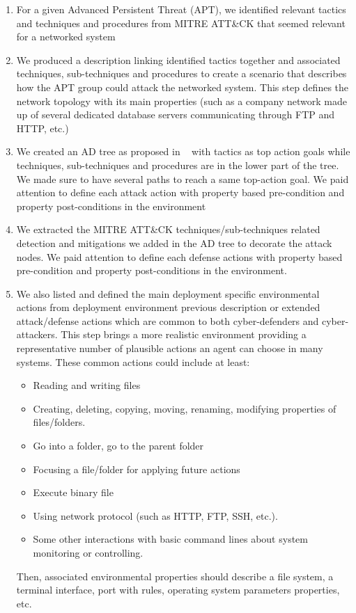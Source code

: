 \documentclass[conference]{IEEEtran}
\begin{document}
\begin{enumerate}

    \item For a given Advanced Persistent Threat (APT), we identified relevant tactics and techniques and procedures from MITRE ATT\&CK that seemed relevant for a networked system
    
    \item We produced a description linking identified tactics together and associated techniques, sub-techniques and procedures to create a scenario that describes how the APT group could attack the networked system. This step defines the network topology with its main properties (such as a company network made up of several dedicated database servers communicating through FTP and HTTP, etc.)

    \item We created an AD tree as proposed in ~\cite{BKordy2010} with tactics as top action goals while techniques, sub-techniques and procedures are in the lower part of the tree. We made sure to have several paths to reach a same top-action goal. We paid attention to define each attack action with property based pre-condition and property post-conditions in the environment

    \item We extracted the MITRE ATT\&CK techniques/sub-techniques related detection and mitigations we added in the AD tree to decorate the attack nodes. We paid attention to define each defense actions with property based pre-condition and property post-conditions in the environment.

    \item We also listed and defined the main deployment specific environmental actions from deployment environment previous description or extended attack/defense actions which are common to both cyber-defenders and cyber-attackers. This step brings a more realistic environment providing a representative number of plausible actions an agent can choose in many systems.
    These common actions could include at least:
    \begin{itemize}
        \item Reading and writing files
        \item Creating, deleting, copying, moving, renaming, modifying properties of files/folders.
        \item Go into a folder, go to the parent folder
        \item Focusing a file/folder for applying future actions
        \item Execute binary file
        \item Using network protocol (such as HTTP, FTP, SSH, etc.).
        \item Some other interactions with basic command lines about system monitoring or controlling.
    \end{itemize}
    Then, associated environmental properties should describe a file system, a terminal interface, port with rules, operating system parameters properties, etc.

\end{enumerate}
\end{document}
